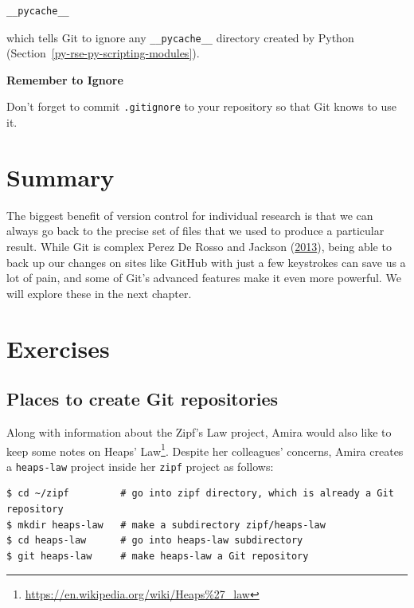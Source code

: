 \documentclass[
]{krantz}
\renewenvironment{quote}{\begin{VF}}{\end{VF}}
\renewcommand{\href}[2]{#2\footnote{\url{#1}}}
\begin{document}
\begin{verbatim}
__pycache__
\end{verbatim}

which tells Git to ignore any \texttt{\_\_pycache\_\_} directory created by Python
(Section~\ref{py-rse-py-scripting-modules}).

\begin{quote}
\textbf{Remember to Ignore}

Don't forget to commit \texttt{.gitignore} to your repository
so that Git knows to use it.
\end{quote}

\hypertarget{git-cmdline-summary}{%
\section{Summary}\label{git-cmdline-summary}}

The biggest benefit of version control for individual research is that
we can always go back to the precise set of files
that we used to produce a particular result.
While Git is complex Perez De Rosso and Jackson (\protect\hyperlink{ref-Pere2013}{2013}),
being able to back up our changes on sites like GitHub
with just a few keystrokes can save us a lot of pain,
and some of Git's advanced features make it even more powerful.
We will explore these in the next chapter.

\hypertarget{git-cmdline-exercises}{%
\section{Exercises}\label{git-cmdline-exercises}}

\hypertarget{git-cmdline-ex-places}{%
\subsection{Places to create Git repositories}\label{git-cmdline-ex-places}}

Along with information about the Zipf's Law project,
Amira would also like to keep some notes on \href{https://en.wikipedia.org/wiki/Heaps\%27_law}{Heaps' Law}.
Despite her colleagues' concerns,
Amira creates a \texttt{heaps-law} project inside her \texttt{zipf} project as follows:

\begin{verbatim}
$ cd ~/zipf         # go into zipf directory, which is already a Git repository
$ mkdir heaps-law   # make a subdirectory zipf/heaps-law
$ cd heaps-law      # go into heaps-law subdirectory
$ git heaps-law     # make heaps-law a Git repository
\end{verbatim}
\end{document}
